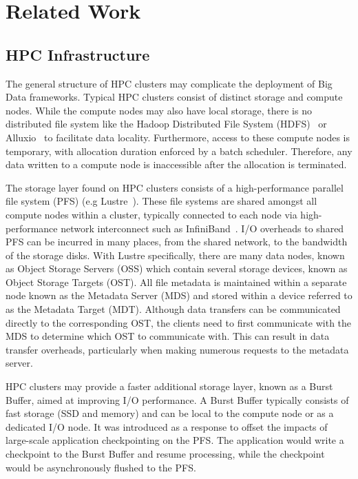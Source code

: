 \section{Related Work}
\subsection{HPC Infrastructure}
      The general structure of HPC clusters may complicate the deployment of Big
      Data frameworks. Typical HPC clusters consist of distinct storage and
      compute nodes. While the compute nodes may also have local storage, there
      is no distributed file system like the Hadoop Distributed File System
      (HDFS)~\cite{shvachko2010hadoop} or Alluxio~\cite{alluxio} to facilitate
      data locality. Furthermore, access to these compute nodes is temporary,
      with allocation duration enforced by a batch scheduler. Therefore, any
      data written to a compute node is inaccessible after the allocation is
      terminated.

      The storage layer found on HPC clusters consists of a high-performance
      parallel file system (PFS) (e.g Lustre~\cite{lustre}). These file systems
      are shared amongst all compute nodes within a cluster, typically connected
      to each node via high-performance network interconnect such as
      InfiniBand~\cite{infiniband}. I/O overheads to shared PFS can be incurred
      in many places, from the shared network, to the bandwidth of the storage
      disks.  With Lustre specifically, there are many data nodes, known as
      Object Storage Servers (OSS) which contain several storage devices, known
      as Object Storage Targets (OST). All file metadata is maintained within a
      separate node known as the Metadata Server (MDS) and stored within a
      device referred to as the Metadata Target (MDT). Although data transfers
      can be communicated directly to the corresponding OST, the clients need to
      first communicate with the MDS to determine which OST to communicate with.
      This can result in data transfer overheads, particularly when making
      numerous requests to the metadata server.
      
      
      HPC clusters may provide a faster additional storage layer, known as a
      Burst Buffer, aimed at improving I/O performance. A Burst Buffer typically
      consists of fast storage (SSD and memory) and can be local to the compute
      node or as a dedicated I/O node. It was introduced as a response to offset
      the impacts of large-scale application checkpointing on the PFS. The
      application would write a checkpoint to the Burst Buffer and resume
      processing, while the checkpoint would be asynchronously flushed to the
      PFS. 


